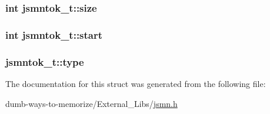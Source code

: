 \subsubsection[{\texorpdfstring{size}{size}}]{\setlength{\rightskip}{0pt plus 5cm}int jsmntok\+\_\+t\+::size}\hypertarget{structjsmntok__t_a8ac3694b7335456c8e602197778883db}{}\label{structjsmntok__t_a8ac3694b7335456c8e602197778883db}
\subsubsection[{\texorpdfstring{start}{start}}]{\setlength{\rightskip}{0pt plus 5cm}int jsmntok\+\_\+t\+::start}\hypertarget{structjsmntok__t_a0a8f55d0095f268ce8e224fe1234acd0}{}\label{structjsmntok__t_a0a8f55d0095f268ce8e224fe1234acd0}
\subsubsection[{\texorpdfstring{type}{type}}]{ jsmntok\+\_\+t\+::type}\hypertarget{structjsmntok__t_ac03dbd6b83cbcd979eb64702d5b9943e}{}\label{structjsmntok__t_ac03dbd6b83cbcd979eb64702d5b9943e}


The documentation for this struct was generated from the following file\+:\begin{DoxyCompactItemize}
\item 
dumb-\/ways-\/to-\/memorize/\+External\+\_\+\+Libs/\hyperlink{jsmn_8h}{jsmn.\+h}\end{DoxyCompactItemize}

